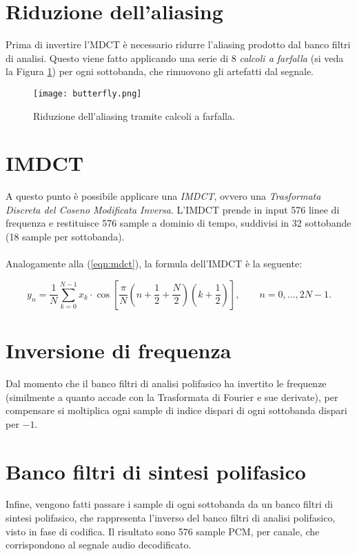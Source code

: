 	\section{Riduzione dell'aliasing} \label{sec:riduzione_aliasing}
		
		Prima di invertire l'MDCT è necessario ridurre l'aliasing prodotto dal banco filtri di analisi. Questo viene fatto applicando una serie di 8 \textit{calcoli a farfalla} (si veda la Figura \ref{fig:butterfly}) per ogni sottobanda, che rimuovono gli artefatti dal segnale.
		
		\begin{figure}[h!]
			\centering
				\texttt{[image: butterfly.png]}
			\caption{Riduzione dell'aliasing tramite calcoli a farfalla.}
			\label{fig:butterfly}
		\end{figure}
		
	\section{IMDCT} \label{sec:imdct}
		
		A questo punto è possibile applicare una \textit{IMDCT}, ovvero una \textit{Trasformata Discreta del Coseno Modificata Inversa}. L'IMDCT prende in input 576 linee di frequenza e restituisce 576 sample a dominio di tempo, suddivisi in 32 sottobande (18 sample per sottobanda).\\
		\\
		Analogamente alla (\ref{eqn:mdct}), la formula dell'IMDCT è la seguente:
		
		\begin{equation} \label{eqn:imdct}
			y_n = \frac{1}{N} \sum_{k=0}^{N-1}x_k\cdot\cos\left[\frac{\pi}{N}\left(n+\frac{1}{2}+\frac{N}{2}\right)\left(k+\frac{1}{2}\right)\right], \qquad n=0,\dots,2N-1.
		\end{equation}
		
	\section{Inversione di frequenza} \label{sec:inversione_frequenza}
		
		Dal momento che il banco filtri di analisi polifasico ha invertito le frequenze (similmente a quanto accade con la Trasformata di Fourier e sue derivate), per compensare si moltiplica ogni sample di indice dispari di ogni sottobanda dispari per $-1$.
		
	\section{Banco filtri di sintesi polifasico} \label{sec:banco_filtri_sintesi_polifasico}
		
		Infine, vengono fatti passare i sample di ogni sottobanda da un banco filtri di sintesi polifasico, che rappresenta l'inverso del banco filtri di analisi polifasico, visto in fase di codifica. Il risultato sono 576 sample PCM, per canale, che corrispondono al segnale audio decodificato.